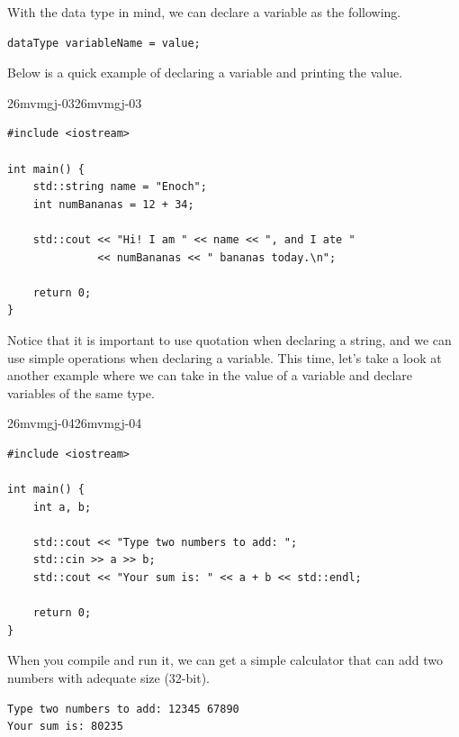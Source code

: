 \documentclass[../../../main.tex]{subfiles}
\begin{document}
With the data type in mind, we can declare a variable as the
following.

\begin{basicbox}
\begin{lstlisting}[style=cppstyle]
dataType variableName = value;
\end{lstlisting}
\end{basicbox}

Below is a quick example of declaring a variable and printing
the value.

\begin{cppbox}{26mvmgj-03}{26mvmgj-03}
\begin{lstlisting}[style=cppstyle]
#include <iostream>

int main() {
    std::string name = "Enoch";
    int numBananas = 12 + 34;

    std::cout << "Hi! I am " << name << ", and I ate "
              << numBananas << " bananas today.\n";

    return 0;
}
\end{lstlisting}
\end{cppbox}

Notice that it is important to use quotation when declaring a
string, and we can use simple operations when declaring a variable.
This time, let's take a look at another example where we can
take in the value of a variable and declare variables of the same
type.

\begin{cppbox}{26mvmgj-04}{26mvmgj-04}
\begin{lstlisting}[style=cppstyle]
#include <iostream>

int main() {
    int a, b;

    std::cout << "Type two numbers to add: ";
    std::cin >> a >> b;
    std::cout << "Your sum is: " << a + b << std::endl;
    
    return 0;
}
\end{lstlisting}
\end{cppbox}

When you compile and run it, we can get a simple calculator that
can add two numbers with adequate size (32-bit).

\begin{outputbox}
\begin{lstlisting}[style=basic]
Type two numbers to add: 12345 67890
Your sum is: 80235
\end{lstlisting}
\end{outputbox}
\end{document}
